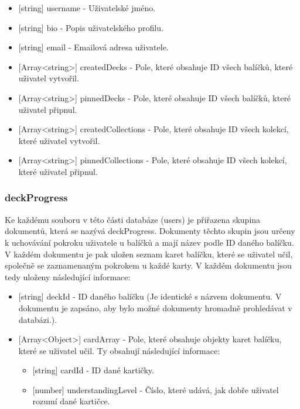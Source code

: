 \documentclass[a4paper,12pt]{article}
\begin{document}
\begin{itemize}
\item
  {[}string{]} username - Uživatelské jméno.
\item
  {[}string{]} bio - Popis uživatelského profilu.
\item
  {[}string{]} email - Emailová adresa uživatele.
\item
  {[}Array\textless string\textgreater{]} createdDecks - Pole, které
  obsahuje ID všech balíčků, které uživatel vytvořil.
\item
  {[}Array\textless string\textgreater{]} pinnedDecks - Pole, které
  obsahuje ID všech balíčků, které uživatel připnul.
\item
  {[}Array\textless string\textgreater{]} createdCollections - Pole,
  které obsahuje ID všech kolekcí, které uživatel vytvořil.
\item
  {[}Array\textless string\textgreater{]} pinnedCollections - Pole,
  které obsahuje ID všech kolekcí, které uživatel připnul.
\end{itemize}

\subsubsection{deckProgress}
Ke každému souboru v této části databáze (users) je přiřazena skupina dokumentů, která se nazývá deckProgress. Dokumenty těchto skupin jsou určeny k uchovávání pokroku uživatele u balíčků a mají název podle ID daného balíčku. V každém dokumentu je pak uložen seznam karet balíčku, které se uživatel učil, společně se zaznamenaným pokrokem u každé karty. V každém dokumentu jsou tedy uloženy následující informace:

\begin{itemize}
\item
{[}string{]} deckId - ID daného balíčku (Je identické s názvem
dokumentu. V dokumentu je zapsáno, aby bylo možné dokumenty hromadně
prohledávat v databázi.).
\item
{[}Array\textless Object\textgreater{]} cardArray - Pole, které obsahuje
objekty karet balíčku, které se uživatel učil. Ty obsahují následující
informace:
\begin{itemize}
\item
  {[}string{]} cardId - ID dané kartičky.
\item
  {[}number{]} understandingLevel - Číslo, které udává, jak dobře
  uživatel rozumí dané kartičce.
\end{itemize}
\end{itemize}
\end{document}

